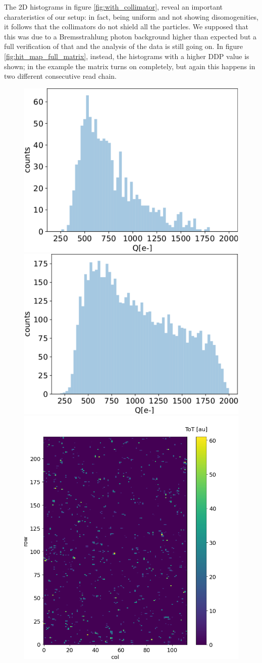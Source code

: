    The 2D histograms in figure \ref{fig:with_collimator}, reveal an important charateristics of our setup: in fact, being uniform and not showing disomogenities, it follows that the collimators do not shield all the particles.
   We supposed that this was due to a Bremsstrahlung photon background higher than expected but a full verification of that and the analysis of the data is still going on. 
   In figure \ref{fig:hit_map_full_matrix}, instead, the histograms with a higher DDP value is shown; in the example the matrix turns on completely, but again this happens in two different consecutive read chain. 
   \begin{figure}
      \centering
      \includegraphics[width=.49\linewidth]{figures/test_beam/Q1_17_11.pdf}
      \includegraphics[width=.49\linewidth]{figures/test_beam/Q2_17_11.pdf}\\   
      \includegraphics[width=.49\linewidth]{figures/test_beam/tot_mapq1_17-11.png}

\end{figure}
